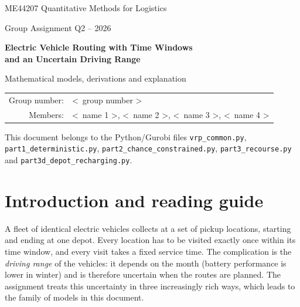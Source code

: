 \documentclass[11pt,a4paper]{article}
\theoremstyle{definition}
\begin{document}
\begin{titlepage}
\centering
\vspace*{3cm}
{\large ME44207 Quantitative Methods for Logistics\par}
\vspace{4pt}
{\large Group Assignment Q2 -- 2026\par}
\vspace{1.4cm}
{\LARGE\bfseries Electric Vehicle Routing with Time Windows\\[4pt] and an Uncertain Driving Range\par}
\vspace{0.8cm}
{\Large Mathematical models, derivations and explanation\par}
\vspace{2.2cm}
\begin{tabular}{rl}
Group number: & \textless\ group number \textgreater\\
Members: & \textless\ name 1 \textgreater, \textless\ name 2 \textgreater, \textless\ name 3 \textgreater, \textless\ name 4 \textgreater
\end{tabular}
\vfill
{\small This document belongs to the Python/Gurobi files \texttt{vrp\_common.py}, \texttt{part1\_deterministic.py}, \texttt{part2\_chance\_constrained.py}, \texttt{part3\_recourse.py} and \texttt{part3d\_depot\_recharging.py}.\par}
\end{titlepage}

{\small\tableofcontents}
\newpage

\section{Introduction and reading guide}
A fleet of identical electric vehicles collects at a set of pickup locations, starting and ending at one depot. Every location has to be visited exactly once within its time window, and every visit takes a fixed service time. The complication is the \emph{driving range} of the vehicles: it depends on the month (battery performance is lower in winter) and is therefore uncertain when the routes are planned. The assignment treats this uncertainty in three increasingly rich ways, which leads to the family of models in this document.
\end{document}

